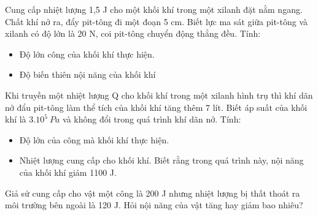 \begin{vidu}
	Cung cấp nhiệt lượng 1,5 J cho một khối khí trong một xilanh đặt nằm ngang. Chất khí nở ra, đẩy pit-tông đi một đoạn 5 cm. Biết lực ma sát giữa pit-tông và xilanh có độ lớn là 20 N, coi pit-tông chuyển động thẳng đều. Tính: 
	\begin{itemize}
		\item[a)] Độ lớn công của khối khí thực hiện.
		\item[b)] Độ biến thiên nội năng của khối khí
	\end{itemize}
\end{vidu}
\begin{vidu}
	Khi truyền một nhiệt lượng Q cho khối khí trong một xilanh hình trụ thì khí dãn nở đẩu pit-tông làm thể tích của khối khí tăng thêm 7 lít. Biết áp suất của khối khí là $3.10^5\ Pa$ và không đổi trong quá trình khí dãn nở. Tính: 
	\begin{itemize}
		\item[a)] Độ lớn của công mà khối khí thực hiện.
		\item[b)] Nhiệt lượng cung cấp cho khối khí. Biết rằng trong quá trình này, nội năng của khối khí giảm 1100 J.
	\end{itemize}
\end{vidu}
\begin{vidu}
	Giả sử cung cấp cho vật một công là 200 J nhưng nhiệt lượng bị thất thoát ra môi trường bên ngoài là 120 J. Hỏi nội năng của vật tăng hay giảm bao nhiêu?
	\loigiai{
		\begin{itemize}
			\item 
			\item 
			\item 
			\item 
			\item 
			\item 
		\end{itemize}
	}
\end{vidu}

